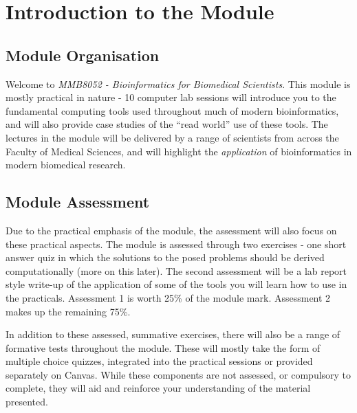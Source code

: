 \documentclass[
  english,
  paper=a4,
  ,captions=tableheading
]{scrartcl}
\begin{document}



{
\setcounter{tocdepth}{3}
\tableofcontents
\newpage
}
\hypertarget{introduction-to-the-module}{%
\section{Introduction to the Module}\label{introduction-to-the-module}}

\hypertarget{module-organisation}{%
\subsection{Module Organisation}\label{module-organisation}}

Welcome to \emph{MMB8052 - Bioinformatics for Biomedical Scientists}.
This module is mostly practical in nature - 10 computer lab sessions
will introduce you to the fundamental computing tools used throughout
much of modern bioinformatics, and will also provide case studies of the
\enquote{read world} use of these tools. The lectures in the module will
be delivered by a range of scientists from across the Faculty of Medical
Sciences, and will highlight the \emph{application} of bioinformatics in
modern biomedical research.

\hypertarget{module-assessment}{%
\subsection{Module Assessment}\label{module-assessment}}

Due to the practical emphasis of the module, the assessment will also
focus on these practical aspects. The module is assessed through two
exercises - one short answer quiz in which the solutions to the posed
problems should be derived computationally (more on this later). The
second assessment will be a lab report style write-up of the application
of some of the tools you will learn how to use in the practicals.
Assessment 1 is worth 25\% of the module mark. Assessment 2 makes up the
remaining 75\%.

In addition to these assessed, summative exercises, there will also be a
range of formative tests throughout the module. These will mostly take
the form of multiple choice quizzes, integrated into the practical
sessions or provided separately on Canvas. While these components are
not assessed, or compulsory to complete, they will aid and reinforce
your understanding of the material presented.
\end{document}

